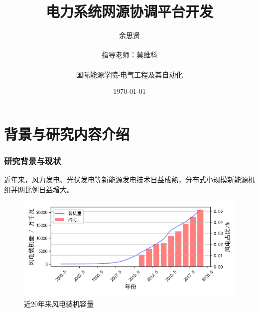 \documentclass[aspectratio=169, 10pt, utf8, mathserif]{beamer}
\begin{document}
	
	
	\title{电力系统网源协调平台开发}
	
	\author[余思贤]{余思贤\\\ 
		\\ 
		指导老师：莫维科\\\ 
		\\
		国际能源学院-电气工程及其自动化
		\quad \\ \vspace{0.5cm}  \quad{}}
	\institute[ ]
	{
		
	}
	\date{\today}
	\begin{frame}
		\titlepage
	\end{frame}
	
	
	\section{背景与研究内容介绍}
	
	
	\begin{frame}
		\frametitle{研究背景与现状}
		近年来，风力发电、光伏发电等新能源发电技术日益成熟，分布式小规模新能源机组并网比例日益增大。
		\begin{figure}[H]
			\centering
			\includegraphics[width=0.5\linewidth]{pic/screenshot005}
			\caption{近20年来风电装机容量}
			\label{fig:screenshot005}
		\end{figure}
	\end{frame}
	
\end{document}
